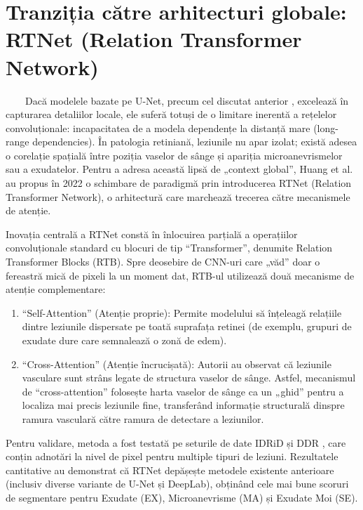 \documentclass[12pt, a4paper, twoside, romanian]{teza-upb}
\begin{document}
\section{Tranziția către arhitecturi globale: RTNet (Relation Transformer Network) \cite{7_huang2022rtnet}}

\ \ \ \ Dacă modelele bazate pe U-Net, precum cel discutat anterior \cite{12_sambyal2020modified}, excelează în
capturarea
detaliilor locale, ele suferă totuși de o limitare inerentă a rețelelor convoluționale: incapacitatea de a
modela dependențe la distanță mare (long-range dependencies). În patologia retiniană, leziunile nu apar
izolat; există adesea o corelație spațială între poziția vaselor de sânge și apariția microanevrismelor sau a
exudatelor. Pentru a adresa această lipsă de „context global”, Huang et al.
\cite{7_huang2022rtnet} au propus în 2022 o
schimbare de paradigmă prin introducerea RTNet (Relation Transformer Network), o arhitectură care
marchează trecerea către mecanismele de atenție.
\bigskip

Inovația centrală a RTNet constă în înlocuirea parțială a operațiilor convoluționale standard cu
blocuri de tip “Transformer”, denumite Relation Transformer Blocks (RTB). Spre deosebire de CNN-uri
care „văd” doar o fereastră mică de pixeli la un moment dat,
RTB-ul utilizează două mecanisme de
atenție complementare:

\begin{enumerate}
  \item “Self-Attention” (Atenție proprie): Permite modelului să înțeleagă relațiile dintre leziunile
        dispersate pe toată suprafața retinei (de exemplu, grupuri de exudate dure care semnalează o
        zonă de edem).

\item “Cross-Attention” (Atenție încrucișată): Autorii au observat că leziunile vasculare sunt strâns
      legate de structura vaselor de sânge. Astfel, mecanismul de “cross-attention” folosește harta
      vaselor de sânge ca un „ghid” pentru a localiza mai precis leziunile fine, transferând informație
      structurală dinspre ramura vasculară către ramura de detectare a leziunilor.
\end{enumerate}
\bigskip

Pentru validare, metoda a fost testată pe seturile de date IDRiD \cite{9_chetoui2020explainable}
și DDR \cite{15_li2019diagnostic}, care conțin adnotări
la nivel de pixel pentru multiple tipuri de leziuni. Rezultatele cantitative au demonstrat că RTNet
depășește metodele existente anterioare (inclusiv diverse variante de U-Net și DeepLab), obținând cele
mai bune scoruri de segmentare pentru Exudate (EX), Microanevrisme (MA) și Exudate Moi (SE).
\bigskip
\end{document}
